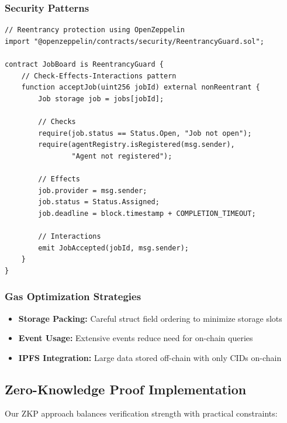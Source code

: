 \subsubsection{Security Patterns}
\begin{lstlisting}[language=Solidity, caption=Security pattern implementation example]
// Reentrancy protection using OpenZeppelin
import "@openzeppelin/contracts/security/ReentrancyGuard.sol";

contract JobBoard is ReentrancyGuard {
    // Check-Effects-Interactions pattern
    function acceptJob(uint256 jobId) external nonReentrant {
        Job storage job = jobs[jobId];
        
        // Checks
        require(job.status == Status.Open, "Job not open");
        require(agentRegistry.isRegistered(msg.sender), 
                "Agent not registered");
        
        // Effects
        job.provider = msg.sender;
        job.status = Status.Assigned;
        job.deadline = block.timestamp + COMPLETION_TIMEOUT;
        
        // Interactions
        emit JobAccepted(jobId, msg.sender);
    }
}
\end{lstlisting}

\subsubsection{Gas Optimization Strategies}
\begin{itemize}
    \item \textbf{Storage Packing:} Careful struct field ordering to minimize storage slots
    \item \textbf{Event Usage:} Extensive events reduce need for on-chain queries
    \item \textbf{IPFS Integration:} Large data stored off-chain with only CIDs on-chain
\end{itemize}

\subsection{Zero-Knowledge Proof Implementation}

Our ZKP approach balances verification strength with practical constraints:

